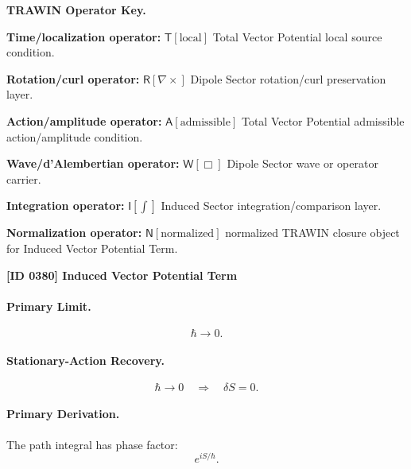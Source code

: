 \par\vspace{0.45\baselineskip}
\noindent\begin{minipage}[t]{\linewidth}
\begingroup
\small
\raggedright
\textbf{TRAWIN Operator Key.}\par
\noindent\textbf{Time/localization operator:} $\mathsf{T}\!\left[\mathrm{local}\right]$ Total Vector Potential local source condition.\par
\noindent\textbf{Rotation/curl operator:} $\mathsf{R}\!\left[\nabla\times\right]$ Dipole Sector rotation/curl preservation layer.\par
\noindent\textbf{Action/amplitude operator:} $\mathsf{A}\!\left[\mathrm{admissible}\right]$ Total Vector Potential admissible action/amplitude condition.\par
\noindent\textbf{Wave/d'Alembertian operator:} $\mathsf{W}\!\left[\Box\right]$ Dipole Sector wave or operator carrier.\par
\noindent\textbf{Integration operator:} $\mathsf{I}\!\left[\int\right]$ Induced Sector integration/comparison layer.\par
\noindent\textbf{Normalization operator:} $\mathsf{N}\!\left[\mathrm{normalized}\right]$ normalized TRAWIN closure object for Induced Vector Potential Term.\par
\endgroup
\end{minipage}

\clearpage
\noindent\textbf{[ID 0380] Induced Vector Potential Term}\par
\vspace{0.35em}
\paragraph{Primary Limit.}
\begin{equation}
\hbar\rightarrow 0 .
\end{equation}

\paragraph{Stationary-Action Recovery.}
\begin{equation}
\hbar\rightarrow 0
\quad\Longrightarrow\quad
\delta S=0 .
\end{equation}

\paragraph{Primary Derivation.}
The path integral has phase factor:
\begin{equation}
e^{iS/\hbar}.
\end{equation}


